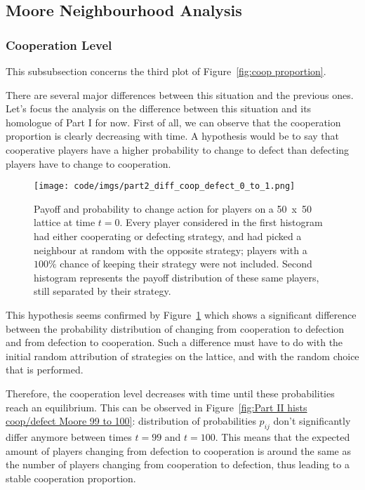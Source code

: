 \documentclass{article}
\begin{document}
\subsection{Moore Neighbourhood Analysis}

\subsubsection{Cooperation Level}

This subsubsection concerns the third plot of Figure~\ref{fig:coop proportion}.

There are several major differences between this situation and the previous ones. Let's focus the analysis
on the difference between this situation and its homologue of Part I for now. First of all, we can observe
that the cooperation proportion is clearly decreasing with time. A hypothesis would be to say that cooperative
players have a higher probability to change to defect than defecting players have to change to cooperation.

\begin{figure}[!h]
\hspace{-1.8cm}
\texttt{[image: code/imgs/part2\_diff\_coop\_defect\_0\_to\_1.png]}
\vspace{-1cm}
\caption{Payoff and probability to change action for players on a 50~x~50 lattice at time $t=0$. Every
player considered in the first histogram had either cooperating or defecting strategy, and had picked a
neighbour at random with the opposite strategy; players with a $100\%$ chance of keeping their strategy
were not included. Second histogram represents the payoff distribution of these same players, still
separated by their strategy. \label{fig:Part II hists coop/defect Moore 0 to 1}}
\end{figure}

This hypothesis seems confirmed by Figure~\ref{fig:Part II hists coop/defect Moore 0 to 1} which shows a
significant difference between the probability distribution of changing from cooperation to defection and
from defection to cooperation. Such a difference must have to do with the initial random attribution of
strategies on the lattice, and with the random choice that is performed.

Therefore, the cooperation level decreases with time until these probabilities reach an equilibrium. This
can be observed in Figure~\ref{fig:Part II hists coop/defect Moore 99 to 100}: distribution of probabilities
$p_{ij}$ don't significantly differ anymore between times $t=99$ and $t=100$. This means that the expected
amount of players changing from defection to cooperation is around the same as the number of players changing
from cooperation to defection, thus leading to a stable cooperation proportion.
\end{document}
